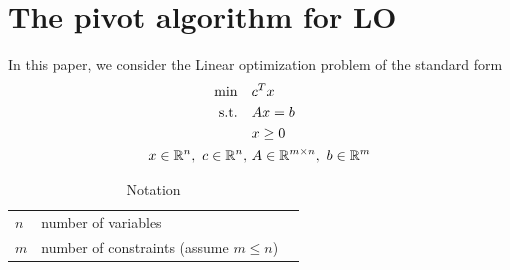 \documentclass[11pt]{article}
\begin{document}
\section{The pivot algorithm for LO}
In this paper, we consider the Linear optimization problem of the standard form
\begin{align}
\begin{split}
\min \quad &c^Tx\\
\text{s.t.} \quad &Ax = b\\
&x \ge 0\\
 x \in \mathbb{R}^n,\ c \in \mathbb{R}^n,\ &A \in \mathbb{R}^{m\times n},\ b \in \mathbb{R}^m   
\end{split}
\end{align}
\begin{table}[h]
\caption{Notation}
\centering
\begin{tabular}{lll}
\hline
$n$ & number of variables   &  \\
$m$ & number of constraints (assume $m \le n$) &  \\
\hline
\end{tabular}
\end{table}
\end{document}
